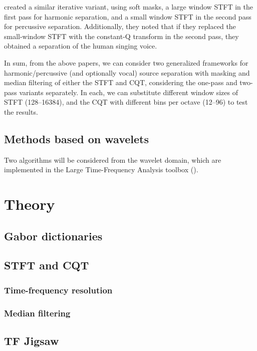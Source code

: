 \documentclass[10pt,letter]{article}
\begin{document}
\citet{fitzgerald2} created a similar iterative variant, using soft masks, a large window STFT in the first pass for harmonic separation, and a small window STFT in the second pass for percussive separation. Additionally, they noted that if they replaced the small-window STFT with the constant-Q transform in the second pass, they obtained a separation of the human singing voice.

In sum, from the above papers, we can consider two generalized frameworks for harmonic/percussive (and optionally vocal) source separation with masking and median filtering of either the STFT and CQT, considering the one-pass and two-pass variants separately. In each, we can substitute different window sizes of STFT (128--16384), and the CQT with different bins per octave (12--96) to test the results.

\subsection{Methods based on wavelets}

Two algorithms will be considered from the wavelet domain, which are implemented in the Large Time-Frequency Analysis toolbox (\cite{ltfat}).

\section{Theory}
\label{sec:theory}

\subsection{Gabor dictionaries}

\subsection{STFT and CQT}

\subsubsection{Time-frequency resolution}

\subsubsection{Median filtering}

\subsection{TF Jigsaw}
\end{document}
